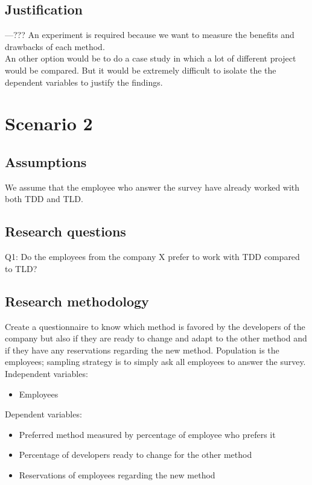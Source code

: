 \documentclass{article}
\begin{document}
\subsection{Justification}
---??? An experiment is required because we want to measure the benefits and drawbacks of each method.\\
An other option would be to do a case study in which a lot of different project would be compared. But it would be extremely difficult to isolate the the dependent variables to justify the findings.


\section{Scenario 2}
\subsection{Assumptions}
We assume that the employee who answer the survey have already worked with both TDD and TLD.

\subsection{Research questions}
Q1: Do the employees from the company X prefer to work with TDD compared to TLD?

\subsection{Research methodology}
Create a questionnaire to know which method is favored by the developers of the company but also if they are ready to change and adapt to the other method and if they have any reservations regarding the new method.
Population is the employees; sampling strategy is to simply ask all employees to answer the survey. \\
Independent variables:
\begin{itemize}
    \item Employees
\end{itemize}
Dependent variables:
\begin{itemize}
    \item Preferred method measured by percentage of employee who prefers it
    \item Percentage of developers ready to change for the other method
    \item Reservations of employees regarding the new method
\end{itemize}
\end{document}
